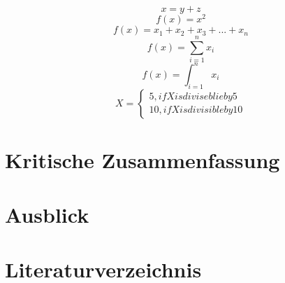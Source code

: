 \documentclass[12pt,a4paper]{article}
\begin{document}
\begin{equation}
x = y + z
\end{equation}
\begin{equation}
f(x) = x^2
\end{equation}
\begin{equation}
f(x) = x_1 + x_2 + x_3 + ... + x_n
\end{equation}
\begin{equation}
f(x) = \sum_{i=1}^{n}{x_i}
\end{equation}
\begin{equation}
f(x) = \int_{i=1}^{n}{x_i}
\end{equation}
\begin{equation}
X=
\begin{cases}
5, if X is diviseblie by 5
\\
10, if X is divisible by 10
\end{cases}
\end{equation}

\section{Kritische Zusammenfassung}

\section{Ausblick}

\section{Literaturverzeichnis}
\end{document}
